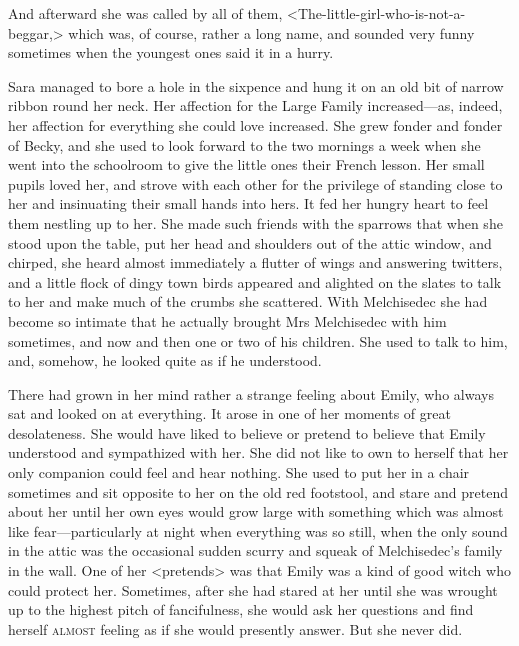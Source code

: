 And afterward she was called by all of them, <The-little-girl-who-is-not-a-beggar,> which was, of course, rather a long name, and sounded very funny sometimes when the youngest ones said it in a hurry.

Sara managed to bore a hole in the sixpence and hung it on an old bit of narrow ribbon round her neck. Her affection for the Large Family increased—as, indeed, her affection for everything she could love increased. She grew fonder and fonder of Becky, and she used to look forward to the two mornings a week when she went into the schoolroom to give the little ones their French lesson. Her small pupils loved her, and strove with each other for the privilege of standing close to her and insinuating their small hands into hers. It fed her hungry heart to feel them nestling up to her. She made such friends with the sparrows that when she stood upon the table, put her head and shoulders out of the attic window, and chirped, she heard almost immediately a flutter of wings and answering twitters, and a little flock of dingy town birds appeared and alighted on the slates to talk to her and make much of the crumbs she scattered. With Melchisedec she had become so intimate that he actually brought Mrs Melchisedec with him sometimes, and now and then one or two of his children. She used to talk to him, and, somehow, he looked quite as if he understood.

There had grown in her mind rather a strange feeling about Emily, who always sat and looked on at everything. It arose in one of her moments of great desolateness. She would have liked to believe or pretend to believe that Emily understood and sympathized with her. She did not like to own to herself that her only companion could feel and hear nothing. She used to put her in a chair sometimes and sit opposite to her on the old red footstool, and stare and pretend about her until her own eyes would grow large with something which was almost like fear—particularly at night when everything was so still, when the only sound in the attic was the occasional sudden scurry and squeak of Melchisedec's family in the wall. One of her <pretends> was that Emily was a kind of good witch who could protect her. Sometimes, after she had stared at her until she was wrought up to the highest pitch of fancifulness, she would ask her questions and find herself \textsc{almost} feeling as if she would presently answer. But she never did.

